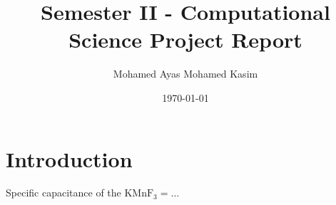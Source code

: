 \documentclass{article}
\title{Semester II - Computational Science Project Report}
\author{Mohamed Ayas Mohamed Kasim}
\date{\today}
\begin{document}
\maketitle

\section{Introduction}
Specific capacitance of the $\text{KMnF}_3 = \dots$
\end{document}
